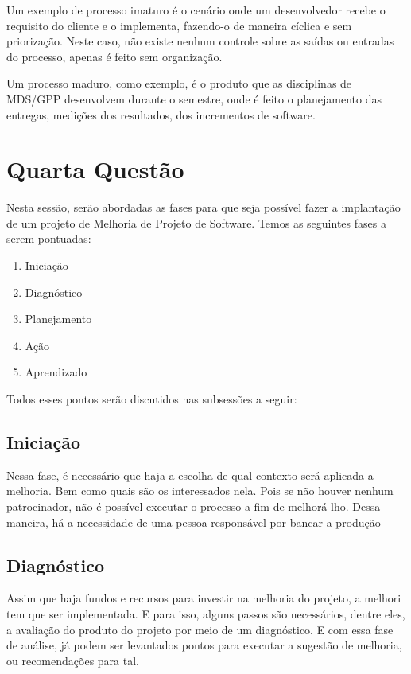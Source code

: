 Um exemplo de processo imaturo é o cenário onde um desenvolvedor recebe o requisito
do cliente e o implementa, fazendo-o de maneira cíclica e sem priorização.
Neste caso, não existe nenhum controle sobre as saídas ou entradas do processo,
apenas é feito sem organização.

Um processo maduro, como exemplo, é o produto que as disciplinas de MDS/GPP
desenvolvem durante o semestre, onde é feito o planejamento das entregas, medições
dos resultados, dos incrementos de software.

\section{Quarta Questão}
\label{sec:Quarta Questão}

Nesta sessão, serão abordadas as fases para que seja possível fazer a implantação
de um projeto de Melhoria de Projeto de Software. Temos as seguintes fases a
serem pontuadas:

\begin{enumerate}
    \item Iniciação
    \item Diagnóstico
    \item Planejamento
    \item Ação
    \item Aprendizado
\end{enumerate}

Todos esses pontos serão discutidos nas subsessões a seguir:

\subsection{Iniciação}
\label{sub:Iniciação}

Nessa fase, é necessário que haja a escolha de qual contexto será aplicada a melhoria.
Bem como quais são os interessados nela. Pois se não houver nenhum patrocinador,
não é possível executar o processo a fim de melhorá-lho. Dessa maneira, há a
necessidade de uma pessoa responsável por bancar a produção

\subsection{Diagnóstico}
\label{sub:Diagnóstico}

Assim que haja fundos e recursos para investir na melhoria do projeto, a melhori
tem que ser implementada. E para isso, alguns passos são necessários, dentre eles,
a avaliação do produto do projeto por meio de um diagnóstico. E com essa fase de
análise, já podem ser levantados pontos para executar a sugestão de melhoria, ou
recomendações para tal.

